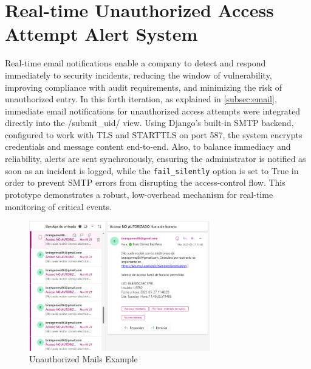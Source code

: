 \section{Real-time Unauthorized Access Attempt Alert System}
Real-time email notifications enable a company to detect and respond immediately to security incidents, reducing the window of vulnerability, improving compliance with audit requirements, and minimizing the risk of unauthorized entry. In this forth iteration, as explained in \ref{subsec:email}, immediate email notifications for unauthorized access attempts were integrated directly into the /submit\_uid/ view. Using Django’s built-in SMTP backend, configured to work with TLS and STARTTLS on port 587, the system encrypts credentials and message content end-to-end. Also, to balance immediacy and reliability, alerts are sent synchronously, ensuring the administrator is notified as soon as an incident is logged, while the \texttt{fail\_silently} option is set to True in order to prevent SMTP errors from disrupting the access-control flow. This prototype demonstrates a robust, low-overhead mechanism for real-time monitoring of critical events.

\begin{figure}[h]
	\centering
	\includegraphics[width=0.7\textwidth]{imaxes/MAIL} %
	\caption{Unauthorized Mails Example}
	\label{fig:unauthorized_mail}
\end{figure}
